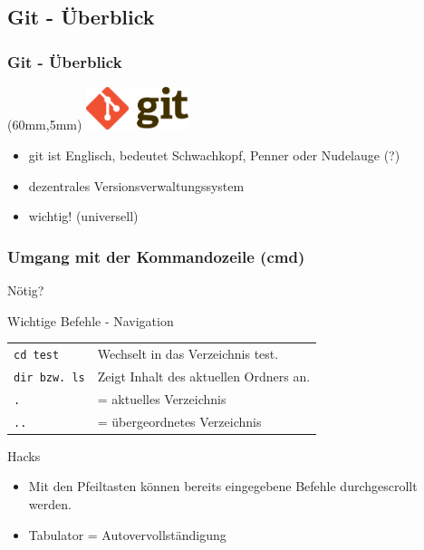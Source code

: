 \documentclass[18pt]{beamer}
\begin{document}
	\subsection{Git - Überblick}
	\begin{frame}
		\frametitle{Git - Überblick}
		\begin{textblock*}{20mm}(60mm,5mm)
			\includegraphics[width=30mm, scale=0.8]{./pics/tut0/Git-logo.png}
		\end{textblock*}
		\begin{itemize}
			\item git ist Englisch, bedeutet Schwachkopf, Penner oder Nudelauge (?)
			\item dezentrales Versionsverwaltungssystem
			\item wichtig! (universell)
		\end{itemize}
	\end{frame}
	
	\begin{frame}
		\frametitle{Umgang mit der Kommandozeile (cmd)}
		Nötig?\linebreak
		\begin{block}{Wichtige Befehle - Navigation}
			\begin{tabular}{ll}
				\texttt{cd test} &  Wechselt in das Verzeichnis test.\\
				\texttt{dir bzw. ls} &  Zeigt Inhalt des aktuellen Ordners an.\\
				\texttt{.} & = aktuelles Verzeichnis\\ 
				\texttt{..} & = übergeordnetes Verzeichnis\\
			\end{tabular}
		\end{block}
		
		\begin{alertblock}{Hacks}
			\begin{itemize}
				\item Mit den Pfeiltasten können bereits eingegebene Befehle durchgescrollt werden.
				\item Tabulator = Autovervollständigung
			\end{itemize}
		\end{alertblock}
		
	\end{frame}
	
\end{document}
